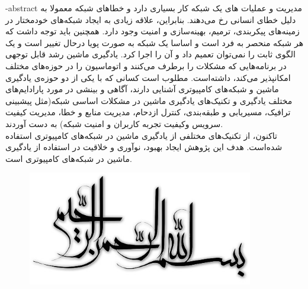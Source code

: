 
\fa-abstract{
مدیریت و عملیات های یک شبکه کار بسیاری دارد و خطا‌های شبکه معمولا به دلیل خطای انسانی رخ می‌دهند. بنابراین، علاقه زیادی به ایجاد شبکه‌های خودمختار در زمینه‌های پیکربندی، ترمیم، بهینه‌سازی و امنیت وجود دارد. همچنین باید توجه داشت که هر شبکه منحصر به فرد است و اساسا یک شبکه به صورت پویا درحال تغییر است و یک الگوی ثابت را نمی‌توان تعمیم داد و آن را اجرا کرد.
یادگیری ماشین رشد قابل توجهی در برنامه‌هایی که مشکلات را برطرف می‌کنند و اتوماسیون را در حوزه‌های مختلف امکانپذیر می‌کند، داشته‌است. مطلوب است کسانی که با یکی از دو حوزه‌ی یادگیری ماشین و شبکه‌های کامپیوتری آشنایی دارند، آگاهی و بینشی در مورد پارادایم‌های مختلف یادگیری و تکنیک‌های یادگیری ماشین در مشکلات اساسی شبکه(مثل پیشبینی ترافیک، مسیریابی و طبقه‌بندی، کنترل ازدحام، مدیریت منابع و خطا، مدیریت کیفیت سرویس وکیفیت تجربه کاربران و امنیت شبکه) به دست آوردند.
\\
تاکنون، از تکنیک‌های مختلفی از یادگیری ماشین در شبکه‌های کامپیوتری استفاده شده‌است. هدف این پژوهش ایجاد بهبود، نوآوری و خلاقیت در استفاده از یادگیری ماشین در شبکه‌های کامپیوتری است.
}





\AUTtitle
\vspace*{7cm}
\thispagestyle{empty}
\begin{center}
\includegraphics[height=5cm,width=12cm]{besm}
\end{center}